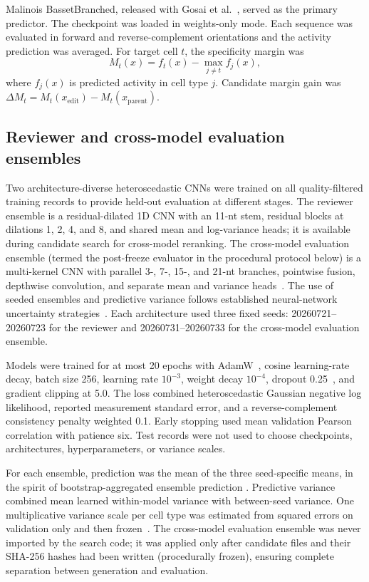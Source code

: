 Malinois BassetBranched, released with Gosai et al.~\citep{Gosai2024}, served as the
primary predictor. The checkpoint was loaded in weights-only mode. Each sequence was
evaluated in forward and reverse-complement orientations and the activity prediction
was averaged. For target cell $t$, the specificity margin was
\begin{equation}
M_t(x)=f_t(x)-\max_{j\ne t} f_j(x),
\end{equation}
where $f_j(x)$ is predicted activity in cell type $j$. Candidate margin gain was
$\Delta M_t=M_t(x_{\mathrm{edit}})-M_t(x_{\mathrm{parent}})$.

\subsection{Reviewer and cross-model evaluation ensembles}

Two architecture-diverse heteroscedastic CNNs were trained on all quality-filtered
training records to provide held-out evaluation at different stages. The reviewer
ensemble is a residual-dilated 1D CNN with an 11-nt stem, residual blocks at
dilations 1, 2, 4, and 8, and shared mean and log-variance heads; it is available
during candidate search for cross-model reranking. The cross-model evaluation
ensemble (termed the post-freeze evaluator in the procedural protocol below) is a
multi-kernel CNN with parallel 3-, 7-, 15-, and 21-nt branches, pointwise fusion,
depthwise convolution, and separate mean and variance
heads~\citep{He2016,Lakshminarayanan2017}. The use of seeded ensembles and predictive
variance follows established neural-network uncertainty strategies~\citep{Gal2016,Blundell2015,Lakshminarayanan2017}.
Each architecture used three fixed seeds:
20260721--20260723 for the reviewer and 20260731--20260733 for the cross-model
evaluation ensemble.

Models were trained for at most 20 epochs with AdamW~\citep{Loshchilov2019}, cosine
learning-rate decay, batch size 256, learning rate $10^{-3}$, weight decay $10^{-4}$,
dropout 0.25~\citep{Srivastava2014}, and gradient clipping at 5.0. The loss combined heteroscedastic Gaussian
negative log likelihood, reported measurement standard error, and a
reverse-complement consistency penalty weighted 0.1. Early stopping used mean
validation Pearson correlation with patience six. Test records were not used to
choose checkpoints, architectures, hyperparameters, or variance scales.

For each ensemble, prediction was the mean of the three seed-specific means, in the
spirit of bootstrap-aggregated ensemble prediction \citep{Breiman2001}. Predictive
variance combined mean learned within-model variance with between-seed variance. One
multiplicative variance scale per cell type was estimated from squared errors on
validation only and then frozen~\citep{Ovadia2019}. The cross-model evaluation
ensemble was never imported by the search code; it was applied only after candidate
files and their SHA-256 hashes had been written (procedurally frozen), ensuring
complete separation between generation and evaluation.

